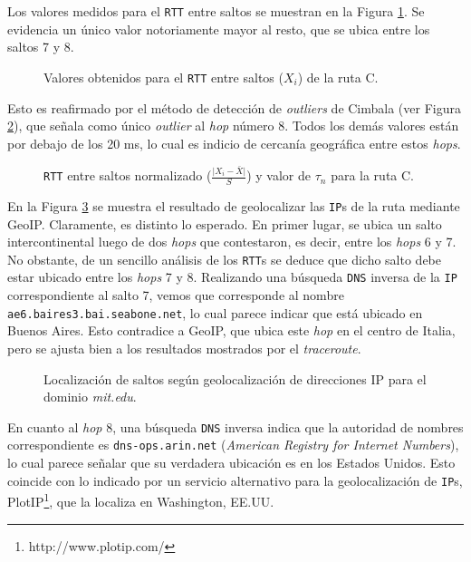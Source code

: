 Los valores medidos para el \texttt{RTT} entre saltos se muestran en
la Figura \ref{res:escC:rtt}. Se evidencia un único valor notoriamente mayor
al resto, que se ubica entre los saltos 7 y 8.

\begin{figure}[H]
    \caption{Valores obtenidos para el \texttt{RTT} entre saltos ($X_i$) de la ruta C.}
    \label{res:escC:rtt}
\end{figure}

Esto es reafirmado por el método de detección de \emph{outliers} de Cimbala
(ver Figura \ref{res:escC:rttnorm}), que señala como único \emph{outlier} al
\emph{hop} número 8. Todos los demás valores están por debajo de los 20 ms,
lo cual es indicio de cercanía geográfica entre estos \emph{hops}.

\begin{figure}[H]
    \caption{\texttt{RTT} entre saltos normalizado ($\frac{\vert X_i-\bar{X}\vert}{S}$)
    y valor de $\tau_n$ para la ruta C.}
    \label{res:escC:rttnorm}
\end{figure}

En la Figura \ref{res:escC:map} se muestra el resultado de geolocalizar las
\texttt{IP}s de la ruta mediante GeoIP. Claramente, es distinto lo esperado.
En primer lugar, se ubica un salto intercontinental luego de dos \emph{hops}
que contestaron, es decir, entre los \emph{hops} 6 y 7. No obstante, de
un sencillo análisis de los \texttt{RTT}s se deduce que dicho salto debe
estar ubicado entre los \emph{hops} 7 y 8. Realizando una búsqueda
\texttt{DNS} inversa de la \texttt{IP} correspondiente al salto 7, vemos que
corresponde al nombre \texttt{ae6.baires3.bai.seabone.net}, lo cual parece
indicar que está ubicado en Buenos Aires. Esto contradice a GeoIP, que ubica
este \emph{hop} en el centro de Italia, pero se ajusta bien a los resultados
mostrados por el \emph{traceroute}.

\begin{figure}[H]
    \caption{Localización de saltos según geolocalización de direcciones IP para
    el dominio \emph{mit.edu}.}
    \label{res:escC:map}
\end{figure}

En cuanto al \emph{hop} 8, una búsqueda \texttt{DNS} inversa indica que la
autoridad de nombres correspondiente es \texttt{dns-ops.arin.net}
(\emph{American Registry for Internet Numbers}), lo cual parece señalar que
su verdadera ubicación es en los Estados Unidos. Esto coincide con lo indicado
por un servicio alternativo para la geolocalización de \texttt{IP}s,
PlotIP\footnote{http://www.plotip.com/}, que la localiza en Washington, EE.UU.

